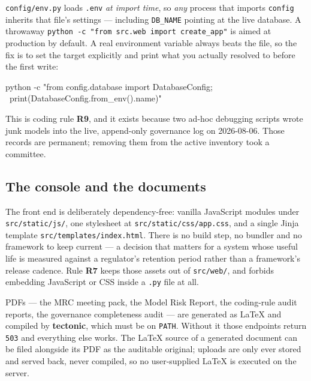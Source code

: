 \documentclass[11pt]{article}
\newcommand{\cfg}[1]{\texttt{#1}}
\newcommand{\rulename}[1]{\textbf{#1}}
\begin{document}
\begin{note}
\texttt{config/env.py} loads \texttt{.env} \emph{at import time}, so \emph{any} process
that imports \texttt{config} inherits that file's settings --- including
\cfg{DB\_NAME} pointing at the live database. A throwaway
\texttt{python -c "from src.web import create\_app"} is aimed at production by default. A
real environment variable always beats the file, so the fix is to set the target
explicitly and print what you actually resolved to before the first write:

\begin{code}
python -c "from config.database import DatabaseConfig; \
           print(DatabaseConfig.from_env().name)"
\end{code}

This is coding rule \rulename{R9}, and it exists because two ad-hoc debugging scripts wrote
junk models into the live, append-only governance log on 2026-08-06. Those records are
permanent; removing them from the active inventory took a committee.
\end{note}

\subsection{The console and the documents}

The front end is deliberately dependency-free: vanilla JavaScript modules under
\texttt{src/static/js/}, one stylesheet at \texttt{src/static/css/app.css}, and a single
Jinja template \texttt{src/templates/index.html}. There is no build step, no bundler and no
framework to keep current --- a decision that matters for a system whose useful life is
measured against a regulator's retention period rather than a framework's release
cadence. Rule \rulename{R7} keeps those assets out of \texttt{src/web/}, and forbids
embedding JavaScript or CSS inside a \texttt{.py} file at all.

PDFs --- the MRC meeting pack, the Model Risk Report, the coding-rule audit reports, the
governance completeness audit --- are generated as \LaTeX{} and compiled by
\textbf{tectonic}, which must be on \texttt{PATH}. Without it those endpoints return
\texttt{503} and everything else works. The \LaTeX{} source of a generated document can be
filed alongside its PDF as the auditable original; uploads are only ever stored and served
back, never compiled, so no user-supplied \LaTeX{} is executed on the server.
\end{document}

